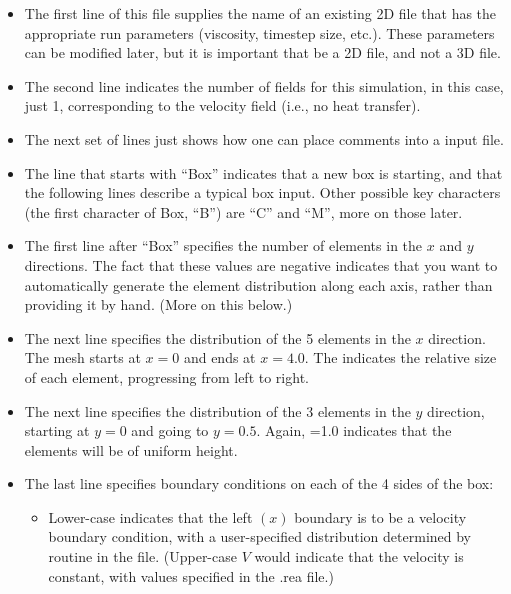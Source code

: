 \documentclass[letterpaper,10pt,english]{sphinxmanual}
\begin{document}
\begin{itemize}
\item {} 
The first line of this file supplies the name of an existing 2D  file that has the appropriate run parameters (viscosity, timestep size, etc.). These parameters can be modified later, but it is important that  be a 2D file, and not a 3D file.

\item {} 
The second line indicates the number of fields for this simulation, in this case, just 1, corresponding to the velocity field (i.e., no heat transfer).

\item {} 
The next set of lines just shows how one can place comments into a  input file.

\item {} 
The line that starts with “Box” indicates that a new box is starting, and that the following lines describe a typical box input.  Other possible key characters (the first character of Box, “B”) are “C” and “M”, more on those later.

\item {} 
The first line after “Box” specifies the number of elements in the
\(x\) and \(y\) directions.   The fact that these values are negative indicates
that you want  to automatically generate the element distribution
along each axis, rather than providing it by hand.  (More on this below.)

\item {} 
The next line specifies the distribution of the 5 elements in the \(x\) direction.
The mesh starts at \(x=0\) and ends at \(x=4.0\).  The  indicates the
relative size of each element, progressing from left to right.

\item {} 
The next line specifies the distribution of the 3 elements in the \(y\) direction,
starting at \(y=0\) and going to \(y=0.5\).  Again,
 =1.0 indicates that the elements will be of uniform height.

\item {} 
The last line specifies boundary conditions on each of the 4 sides of the
box:
\begin{itemize}
\item {} 
Lower-case  indicates that the left \((x)\) boundary is to be a velocity
boundary condition, with a user-specified distribution determined by
routine  in the  file.  (Upper-case \(V\) would indicate that
the velocity is constant, with values specified in the .rea file.)


\end{itemize}
\end{itemize}
\end{document}

